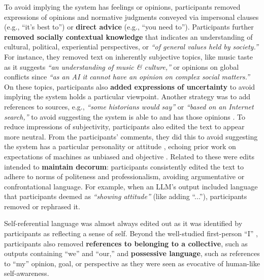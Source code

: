 \documentclass[11pt]{article}
\begin{document}
To avoid implying the system has feelings or opinions, participants removed expressions of opinions \cite{Glaese2022-qo} and normative judgments conveyed via impersonal clauses (e.g., ``it's best to'') 
\cite{Emnett2024-na} or \textbf{direct advice} (e.g., ``you need to'').
Participants further \textbf{removed socially contextual knowledge} that indicates an understanding of cultural, political, experiential perspectives, or \textit{``of general values held by society.''} 
For instance, they removed text on inherently subjective topics, like music taste as it suggests \textit{``an understanding of music \& culture,''} or opinions on global conflicts since \textit{``as an AI it cannot have an opinion on complex social matters.''} 
On these topics, participants also \textbf{added expressions of uncertainty} to avoid implying the system holds a particular viewpoint. 
Another strategy was to add references to sources, e.g., \textit{``some historians would say''} or \textit{``based on an Internet search,''} to 
avoid suggesting the system is able to and has those opinions \cite{lingel2020alexa,abercrombie-etal-2023-mirages}. 
To reduce impressions of subjectivity, participants also edited the text to appear more %
neutral. 
From the participants' comments, they did this to avoid suggesting the system has a particular personality or attitude \cite{Maeda2024-cv}, echoing prior work on expectations of machines as unbiased and objective \cite{quintanar1982interactive}. 
Related to these were edits intended to \textbf{maintain decorum}: participants consistently edited the text to adhere to norms of politeness and professionalism, avoiding argumentative or confrontational language. 
For example, when an LLM's output included language that participants deemed as \textit{``showing attitude''} (like adding ``...''), participants removed or rephrased it. 


Self-referential language was almost always edited out as it was identified by participants as reflecting a sense of self. 
Beyond the well-studied first-person ``I''  \cite{shneidermandumpty,abercrombie-etal-2023-mirages,cohn2024believing}, participants also removed \textbf{references to belonging to a collective}, such as outputs containing ``we'' and ``our,''
and \textbf{possessive language}, such as references to ``my'' opinion, goal, or perspective as they were seen as evocative of human-like self-awareness.
\end{document}

